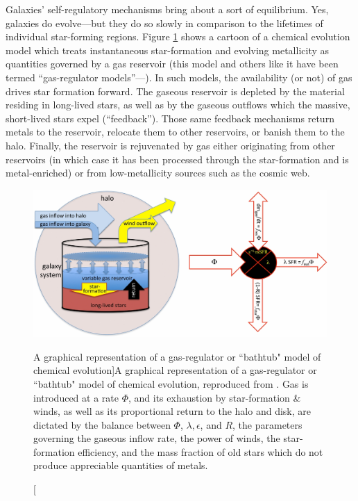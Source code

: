 Galaxies' self-regulatory mechanisms bring about a sort of equilibrium. Yes, galaxies do evolve---but they do so slowly in comparison to the lifetimes of individual star-forming regions. Figure \ref{fig:gasreg_model} shows a cartoon of a chemical evolution model which treats instantaneous star-formation and evolving metallicity as quantities governed by a gas reservoir (this model and others like it have been termed ``gas-regulator models''---\citealt{lilly_13_gasreg, finlator_dave_oppenheimer_12}). In such models, the availability (or not) of gas drives star formation forward. The gaseous reservoir is depleted by the material residing in long-lived stars, as well as by the gaseous outflows which the massive, short-lived stars expel (``feedback''). Those same feedback mechanisms return metals to the reservoir, relocate them to other reservoirs, or banish them to the halo. Finally, the reservoir is rejuvenated by gas either originating from other reservoirs (in which case it has been processed through the star-formation and is metal-enriched) or from low-metallicity sources such as the cosmic web.

\begin{figure}
    \centering
    \includegraphics[width=\textwidth]{gasreg_model}
    \caption[A graphical representation of a gas-regulator or ``bathtub" model of chemical evolution]{\fixspacing A graphical representation of a gas-regulator or ``bathtub" model of chemical evolution, reproduced from \citet{lilly_13_gasreg}. Gas is introduced at a rate $\Phi$, and its exhaustion by star-formation \& winds, as well as its proportional return to the halo and disk, are dictated by the balance between $\Phi$, $\lambda, \epsilon$, and $R$, the parameters governing the gaseous inflow rate, the power of winds, the star-formation efficiency, and the mass fraction of old stars which do not produce appreciable quantities of metals.}
    \label{fig:gasreg_model}
\end{figure}

